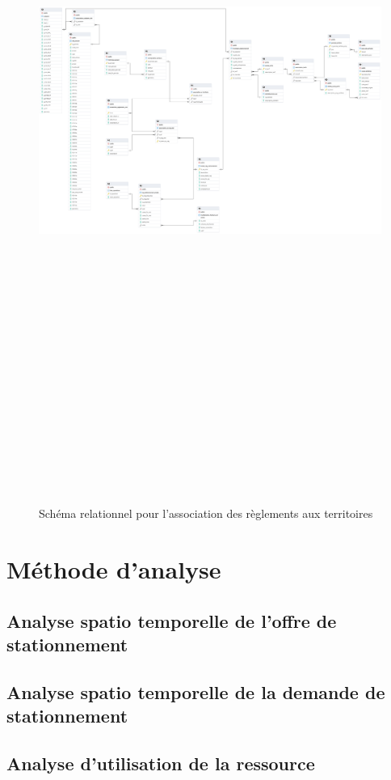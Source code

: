     \begin{figure}
        \centering
        \includegraphics[trim={0cm 0cm 80cm 0cm},clip,height=25cm]{images/structure_base_de_donnee.png}
        \caption{Schéma relationnel pour l'association des règlements aux territoires}
        \label{fig:offstreet_db_erd_input_data}
    \end{figure}
    \FloatBarrier
    
\section{Méthode d'analyse}
  \subsection{Analyse spatio temporelle de l'offre de stationnement}
  \subsection{Analyse spatio temporelle de la demande de stationnement}
  \subsection{Analyse d'utilisation de la ressource}

